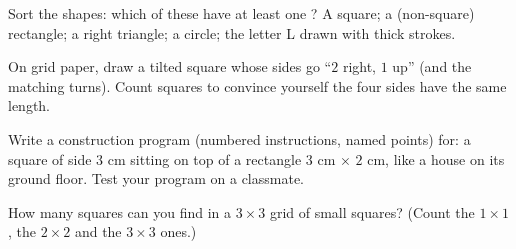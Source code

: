 \begin{exercise}[$\star$]\label{exo:g3:shapes:8}
Sort the shapes: which of these have at least one ?
A square; a (non-square) rectangle; a right triangle; a circle; the
letter L drawn with thick strokes.
\end{exercise}

\begin{exercise}[$\star\star$]\label{exo:g3:shapes:9}
On grid paper, draw a tilted square whose sides go ``$2$ right, $1$
up'' (and the matching turns). Count squares to convince yourself
the four sides have the same length.
\end{exercise}

\begin{exercise}[$\star\star$]\label{exo:g3:shapes:10}
Write a construction program (numbered instructions, named points)
for: a square of side $3$ cm sitting on top of a rectangle
$3$ cm $\times$ $2$ cm, like a house on its ground floor. Test your
program on a classmate.
\end{exercise}

\begin{exercise}[$\star\star$]\label{exo:g3:shapes:11}
How many squares can you find in a $3 \times 3$ grid of small
squares? (Count the $1 \times 1$, the $2 \times 2$ and the
$3 \times 3$ ones.)
\end{exercise}

